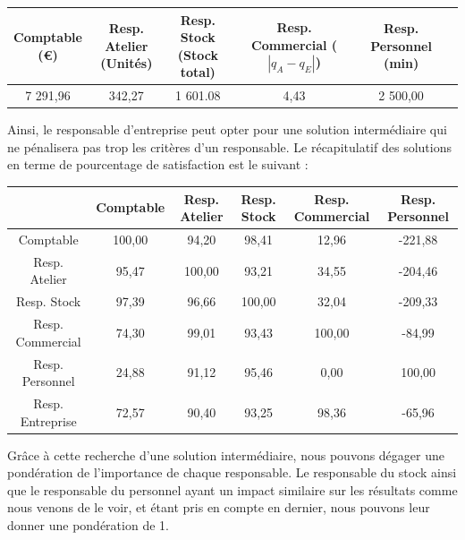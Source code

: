 \documentclass[paper=a4, fontsize=11pt]{report}
\numberwithin{equation}{section}		%
\numberwithin{figure}{section}			%
\numberwithin{table}{section}				%
\newcommand\abs[1]{\left|#1\right|}
\begin{document}
\begin{table}[H]
\begin{center}
\begin{tabular}{c|ccccc}
\shortstack{Comptable \\ \scriptsize{(€)}} & \shortstack{Resp. Atelier \\ \scriptsize (Unités)} & \shortstack{Resp.  Stock \\ \scriptsize (Stock total)} & \shortstack{Resp.  Commercial \\ \scriptsize ($\abs{q_A - q_E}$)} &   \shortstack{Resp.  Personnel \\ \scriptsize (min)} \\ 
\hline 
7 291,96 & 342,27 & 1 601.08 & 4,43 & 2 500,00 \\ 
\end{tabular}
\end{center}
\end{table}

Ainsi, le responsable d'entreprise peut opter pour une solution intermédiaire qui ne pénalisera pas trop les critères d'un responsable. Le récapitulatif des solutions en terme de pourcentage de satisfaction est le suivant :

\begin{table}[H]
\begin{center}
\begin{tabular}{c|ccccc}
 & Comptable & Resp. Atelier & Resp.  Stock & Resp.  Commercial &  Resp.  Personnel\\ 
\hline 
Comptable &  \cellcolor{black!5} 100,00 & 94,20 & 98,41 & 12,96 & -221,88 \\ 
Resp. Atelier & 95,47 & \cellcolor{black!5}100,00 & 93,21 & 34,55 & -204,46 \\ 
Resp.  Stock & 97,39 & 96,66 & \cellcolor{black!5}100,00 & 32,04 & -209,33 \\ 
Resp.  Commercial & 74,30 & 99,01 & 93,43 & \cellcolor{black!5}100,00 & -84,99 \\ 
Resp.  Personnel & 24,88 & 91,12 & 95,46 & 0,00 & \cellcolor{black!5}100,00 \\ 
Resp. Entreprise & 72,57 & 90,40 & 93,25 & 98,36 & -65,96 \\
\end{tabular}
\end{center}
\end{table}

Grâce à cette recherche d'une solution intermédiaire, nous pouvons dégager une pondération de l'importance de chaque responsable. Le responsable du stock ainsi que le responsable du personnel ayant un impact similaire sur les résultats comme nous venons de le voir, et étant pris en compte en dernier, nous pouvons leur donner une pondération de 1.\\
\end{document}
